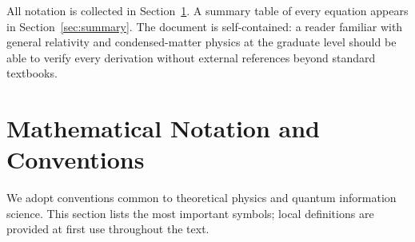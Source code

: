 \documentclass[11pt,a4paper]{article}
\theoremstyle{remark}
\begin{document}
All notation is collected in Section~\ref{sec:notation}.  A summary table of every equation appears in Section~\ref{sec:summary}.  The document is self-contained: a reader familiar with general relativity and condensed-matter physics at the graduate level should be able to verify every derivation without external references beyond standard textbooks.

\section{Mathematical Notation and Conventions}
\label{sec:notation}

We adopt conventions common to theoretical physics and quantum information science.  This section lists the most important symbols; local definitions are provided at first use throughout the text.
\end{document}
